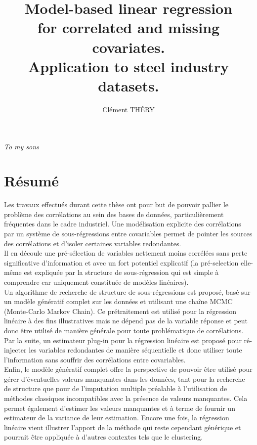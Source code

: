 \documentclass[12pt,a4paper]{report}
\author{Clément TH\'ERY}
\title{Model-based linear regression \\ for correlated  and missing covariates.\\ Application to steel industry datasets.}
\begin{document}
%	
\maketitle

\newpage
\itshape To my sons
\upshape


\chapter*{Résumé}
	Les travaux effectués durant cette thèse ont pour but de pouvoir pallier le problème des corrélations au sein des bases de données, particulièrement fréquentes dans le cadre industriel. Une modélisation explicite des corrélations par un système de sous-régressions entre covariables permet de pointer les sources des corrélations et d'isoler certaines variables redondantes. 
	\\
	
	Il en découle une pré-sélection de variables nettement moins corrélées sans perte significative d'information et avec un fort potentiel explicatif (la pré-selection elle-même est expliquée par la structure de sous-régression qui est simple à comprendre car uniquement constituée de modèles linéaires). \\
	
	Un algorithme de recherche de structure de sous-régressions est proposé, basé sur un modèle génératif complet sur les données et utilisant une chaîne MCMC (Monte-Carlo Markov Chain). Ce prétraitement est utilisé pour la régression linéaire à des fins illustratives mais ne dépend pas de la variable réponse et peut donc être utilisé de manière générale pour toute problématique de corrélations.\\
	
	Par la suite, un estimateur plug-in pour la régression linéaire est proposé pour ré-injecter les variables redondantes de manière séquentielle et donc utiliser toute l'information sans souffrir des corrélations entre covariables.
	\\
	
	Enfin, le modèle génératif complet offre la perspective de pouvoir être utilisé pour gérer d'éventuelles valeurs manquantes dans les données, tant pour la recherche de structure que pour de l'imputation multiple préalable à l'utilisation de méthodes classiques incompatibles avec la présence de valeurs manquantes. Cela permet également d'estimer les valeurs manquantes et à terme  de fournir un estimateur de la variance de leur estimation.
	Encore une fois, la régression linéaire vient illustrer l'apport de la méthode qui reste cependant générique et pourrait être appliquée à d'autres contextes tels que le clustering.
	\\	
	
\end{document}
